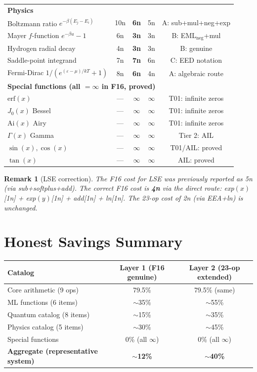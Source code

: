 \documentclass[11pt]{article}
\newtheorem{remark}[theorem]{Remark}
\begin{document}
\begin{longtable}{lcccc}
\midrule
\multicolumn{5}{l}{\textbf{Physics}} \\
Boltzmann ratio $e^{-\beta(E_j-E_i)}$ & 10n & \textbf{6n} & 5n & A: sub+mul+neg+exp \\
Mayer $f$-function $e^{-\beta u}-1$ & 6n & \textbf{3n} & 3n & B: EML$_{\mathrm{neg}}$+mul \\
Hydrogen radial decay & 4n & \textbf{3n} & 3n & B: genuine \\
Saddle-point integrand & 7n & \textbf{7n} & 6n & C: EED notation \\
Fermi-Dirac $1/(e^{(\varepsilon-\mu)/kT}+1)$ & 8n & \textbf{6n} & 4n & A: algebraic route \\
\midrule
\multicolumn{5}{l}{\textbf{Special functions (all $= \infty$ in F16, proved)}} \\
$\mathrm{erf}(x)$ & --- & $\infty$ & $\infty$ & T01: infinite zeros \\
$J_0(x)$ Bessel & --- & $\infty$ & $\infty$ & T01: infinite zeros \\
$\mathrm{Ai}(x)$ Airy & --- & $\infty$ & $\infty$ & T01: infinite zeros \\
$\Gamma(x)$ Gamma & --- & $\infty$ & $\infty$ & Tier 2: AIL \\
$\sin(x), \cos(x)$ & --- & $\infty$ & $\infty$ & T01/AIL: proved \\
$\tan(x)$ & --- & $\infty$ & $\infty$ & AIL: proved \\
\bottomrule
\end{longtable}

\begin{remark}[LSE correction]
The F16 cost for LSE was previously reported as 5n (via sub+softplus+add).
The correct F16 cost is \textbf{4n} via the direct route: exp$(x)$[1n] + exp$(y)$[1n]
+ add[1n] + ln[1n]. The 23-op cost of 2n (via EEA+ln) is unchanged.
\end{remark}

\section{Honest Savings Summary}

\begin{center}
\renewcommand{\arraystretch}{1.3}
\begin{tabular}{lcc}
\toprule
Catalog & Layer 1 (F16 genuine) & Layer 2 (23-op extended) \\
\midrule
Core arithmetic (9 ops) & 79.5\% & 79.5\% (same) \\
ML functions (6 items) & $\sim$35\% & $\sim$55\% \\
Quantum catalog (8 items) & $\sim$15\% & $\sim$35\% \\
Physics catalog (5 items) & $\sim$30\% & $\sim$45\% \\
Special functions & 0\% (all $\infty$) & 0\% (all $\infty$) \\
\midrule
\textbf{Aggregate (representative system)} & \textbf{$\sim$12\%} & \textbf{$\sim$40\%} \\
\bottomrule
\end{tabular}
\end{center}
\end{document}
